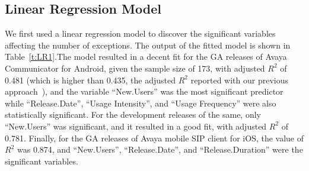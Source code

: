 \documentclass[smallextended]{svjour3}       %
\begin{document}
\subsection{Linear Regression Model}
We first used a linear regression model to discover the significant variables affecting the number of exceptions. The  output  of the fitted model is shown in Table~\ref{t:LR1}.The model resulted in a decent fit for the GA releases of Avaya Communicator for Android, given the sample size of 173, with adjusted $R^2$ of 0.481 (which is higher than  0.435, the adjusted $R^2$  reported with our previous approach~\cite{dey2018modeling}), and the variable ``New.Users'' was the most significant predictor while ``Release.Date'', ``Usage Intensity'', and ``Usage Frequency'' were also statistically significant. For the development releases of the same, only ``New.Users'' was significant, and it resulted in a good fit, with adjusted $R^2$ of 0.781.
Finally, for the GA releases of Avaya mobile SIP client for iOS, the value of $R^2$ was 0.874, and ``New.Users'', ``Release.Date'', and ``Release.Duration'' were the significant variables.


\begin{table}[ht]
\caption{Summary Result of LR model for ``Exceptions"}\label{t:LR1}
\centering
{}
\end{table}
\end{document}
